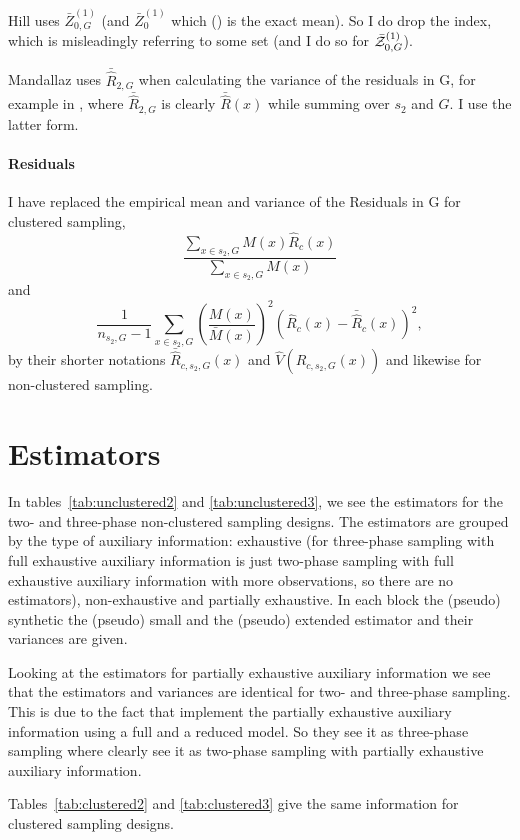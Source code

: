 \documentclass[a4paper]{article}
\begin{document}
Hill uses $\bar{Z}_{0,G}^{(1)}$ (and $\bar{Z}_{0}^{(1)}$ which
(\cite[p.~18]{hill2017}) is the exact mean). So I do drop the index,
which is misleadingly referring to some set (and I do so for
$\bar{\mathcal{Z}}_{0,G}^{(1)}$).


Mandallaz uses $\bar{\hat{R}}_{2,G}$ when calculating the variance of the
residuals in G, for example in \cite[eq 26]{Man13a}, where  $\bar{\hat{R}}_{2,G}$ is clearly
$\bar{\hat{R}}(x)$ while summing over $s_2$ and $G$. I use the latter form.

\paragraph{Residuals}
I have replaced
the empirical mean and variance of the Residuals in G for clustered
sampling,
$$\frac{\sum_{x\in s_2,G}{M(x)\hat{R}_c(x)}}{\sum_{x\in s_2,G}{M(x)}}$$
and
$$\frac{1}{n_{s_2,G}-1} \sum_{x\in
s_2,G}{\left(\frac{M(x)}{\bar{M}(x)}\right)^2 (\hat{R}_c(x)
-\bar{\hat{R}}_c(x))^2},$$
by their shorter notations
$\bar{\hat{R}}_{c,s_2,G}(x)$ and 
$\hat{V}(\hat{R}_{c,s_2,G}(x))$
and likewise for non-clustered sampling.



\section{Estimators\label{sec:estimators}}

In tables~\ref{tab:unclustered2} and \ref{tab:unclustered3},
we see the estimators for the two- and three-phase non-clustered sampling
designs.
The estimators are grouped by the type of auxiliary information: exhaustive (for
 three-phase sampling with full exhaustive auxiliary
information is just two-phase sampling with full exhaustive auxiliary
information with more observations, so there are no estimators),
non-exhaustive and partially exhaustive.
In each block the (pseudo) synthetic the (pseudo) small and the
(pseudo) extended estimator and their variances are given.



Looking at the estimators for partially exhaustive auxiliary information
we see that the estimators and variances are identical for two- and three-phase sampling.
This is due to the fact that 
\cite{hill2017} implement the partially exhaustive auxiliary information using
a full and a reduced model. So they see it as three-phase
sampling where \cite{Man13b} clearly see it as two-phase sampling with partially
exhaustive auxiliary information.



Tables~\ref{tab:clustered2} and \ref{tab:clustered3} give the same information for clustered sampling
designs.



{

    
    
}




\end{document}
